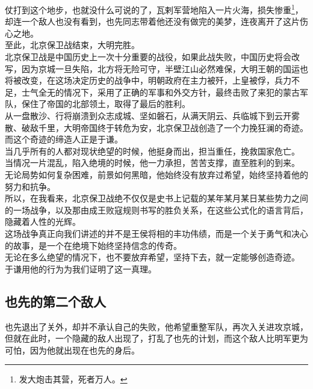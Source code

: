 \begin{multicols}{\theparacolNo}
仗打到这个地步，也就没什么可说的了，瓦剌军营地陷入一片火海，损失惨重\footnote{发大炮击其营，死者万人。}，却连一个敌人也没有看到，也先同志带着他还没有做完的美梦，连夜离开了这片伤心之地。\\

至此，北京保卫战结束，大明完胜。\\

北京保卫战是中国历史上一次十分重要的战役，如果此战失败，中国历史将会改写，因为京城一旦失陷，北方将无险可守，半壁江山必然难保，大明王朝的国运也将被改变，在这场决定历史的战争中，明朝政府在主力被歼，上皇被俘，兵力不足，士气全无的情况下，采用了正确的军事和外交方针，最终击败了来犯的蒙古军队，保住了帝国的北部领土，取得了最后的胜利。\\

从一盘散沙、行将崩溃到众志成城、坚如磐石，从满天阴云、兵临城下到云开雾散、破敌千里，大明帝国终于转危为安，北京保卫战创造了一个力挽狂澜的奇迹。而这个奇迹的缔造人正是于谦。\\

当几乎所有的人都对现状绝望的时候，他挺身而出，担当重任，挽救国家危亡。\\

当情况一片混乱，陷入绝境的时候，他一力承担，苦苦支撑，直至胜利的到来。\\

无论局势如何复杂困难，前景如何黑暗，他始终没有放弃过希望，始终坚持着他的努力和抗争。\\

所以，在我看来，北京保卫战绝不仅仅是史书上记载的某年某月某日某些势力之间的一场战争，以及那由成王败寇规则书写的胜负关系，在这些公式化的语言背后，隐藏着人性的光辉。\\

这场战争真正向我们讲述的并不是王侯将相的丰功伟绩，而是一个关于勇气和决心的故事，是一个在绝境下始终坚持信念的传奇。\\

无论在多么绝望的情况下，也不要放弃希望，坚持下去，就一定能够创造奇迹。\\

于谦用他的行为为我们证明了这一真理。\\

\subsection{也先的第二个敌人}
也先退出了关外，却并不承认自己的失败，他希望重整军队，再次入关进攻京城，但就在此时，一个隐藏的敌人出现了，打乱了也先的计划，而这个敌人比明军更为可怕，因为他就出现在也先的身后。\\


\end{multicols}
